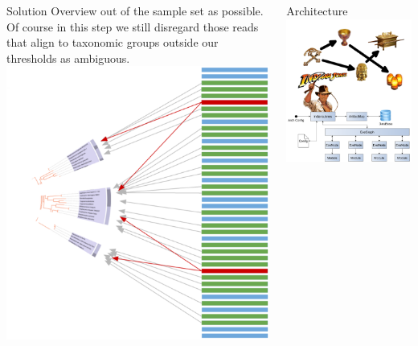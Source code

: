 \documentclass[final,t]{beamer}
\begin{document}
\begin{frame}{}
\begin{columns}[t]
\begin{column}{.3\linewidth}
\begin{block}{Solution Overview}
            out of the sample set as possible. Of course in this step we still disregard those reads that align to taxonomic groups outside our
            thresholds as ambiguous.
            \includegraphics[width=0.679\linewidth, right]{assets/Subset}
        \end{block}


    \end{column}


    \begin{column}{.3\linewidth}
        \begin{block}{Architecture}
            \includegraphics[width=1\linewidth]{assets/arch}\newline\newline


\end{block}
\end{column}
\end{columns}
\end{frame}
\end{document}
